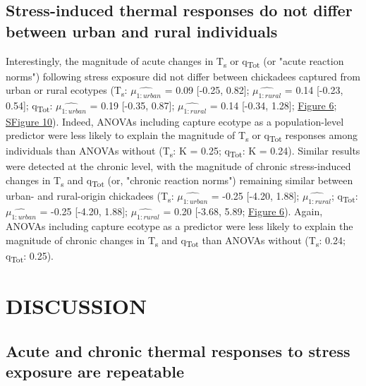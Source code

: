 \documentclass[12pt]{article}
\begin{document}
\subsection{Stress-induced thermal responses do not differ between urban and rural individuals}
\vspace{0.5cm}

\noindent Interestingly, the magnitude of acute changes in T\textsubscript{s} or q\textsubscript{Tot} (or "acute reaction norms") following stress exposure did not differ between chickadees captured from urban or rural ecotypes (T\textsubscript{s}: $\hat{\mu_{1:\mathit{urban}}}$ = 0.09 [-0.25, 0.82]; $\hat{\mu_{1:\mathit{rural}}}$ = 0.14 [-0.23, 0.54]; q\textsubscript{Tot}: $\hat{\mu_{1:\mathit{urban}}}$ = 0.19 [-0.35, 0.87]; $\hat{\mu_{1:\mathit{rural}}}$ = 0.14 [-0.34, 1.28]; \hyperref[Fig4.6]{Figure 6}; \hyperref[FigC.10]{SFigure 10}). Indeed, ANOVAs including capture ecotype as a population-level predictor were less likely to explain the magnitude of T\textsubscript{s} or q\textsubscript{Tot} responses among individuals than ANOVAs without (T\textsubscript{s}: K = 0.25; q\textsubscript{Tot}: K = 0.24). Similar results were detected at the chronic level, with the magnitude of chronic stress-induced changes in T\textsubscript{s} and q\textsubscript{Tot} (or, "chronic reaction norms") remaining similar between urban- and rural-origin chickadees (T\textsubscript{s}: $\hat{\mu_{1:\mathit{urban}}}$ = -0.25 [-4.20, 1.88]; $\hat{\mu_{1:\mathit{rural}}}$; q\textsubscript{Tot}: $\hat{\mu_{1:\mathit{urban}}}$ = -0.25 [-4.20, 1.88]; $\hat{\mu_{1:\mathit{rural}}}$ = 0.20 [-3.68, 5.89; \hyperref[Fig4.6]{Figure 6}). Again, ANOVAs including capture ecotype as a predictor were less likely to explain the magnitude of chronic changes in T\textsubscript{s} and q\textsubscript{Tot} than ANOVAs without (T\textsubscript{s}: 0.24; q\textsubscript{Tot}: 0.25).\vspace{0.5cm}

\section{DISCUSSION}

\subsection{Acute and chronic thermal responses to stress exposure are repeatable}
\vspace{0.5cm}
\end{document}
